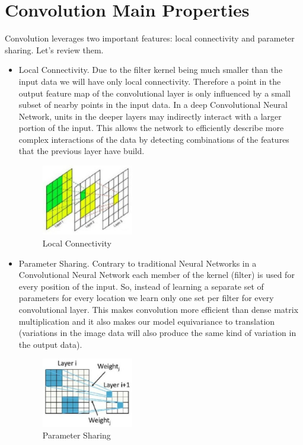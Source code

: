 \newpage
\section{Convolution Main Properties}

Convolution leverages two important features: local connectivity and parameter sharing. Let’s review them.

\begin{itemize}
    \item Local Connectivity. Due to the filter kernel being much smaller than the input data we will have only local connectivity. Therefore a point in the output feature map of the convolutional layer is only influenced by a small subset of nearby points in the input data. In a deep Convolutional Neural Network, units in the deeper layers may indirectly interact with a larger portion of the input. This allows the network to efficiently describe more complex interactions of the data by detecting combinations of the features that the previous layer have build.

    \begin{figure}[h]
        \centering
        \includegraphics[width=4cm]{Images/local-connectivity.jpg}
        \caption{Local Connectivity}
    \end{figure}

    \item Parameter Sharing. Contrary to traditional Neural Networks in a Convolutional Neural Network each member of the kernel (filter) is used for every position of the input. So, instead of learning a separate set of parameters for every location we learn only one set per filter for every convolutional layer. This makes convolution more efficient than dense matrix multiplication and it also makes our model equivariance to translation (variations in the image data will also produce the same kind of variation in the output data).
    \begin{figure}[h]
        \centering
        \includegraphics[width=4cm]{Images/parameter-sharing.jpg}
        \caption{Parameter Sharing}
    \end{figure}

\end{itemize}

